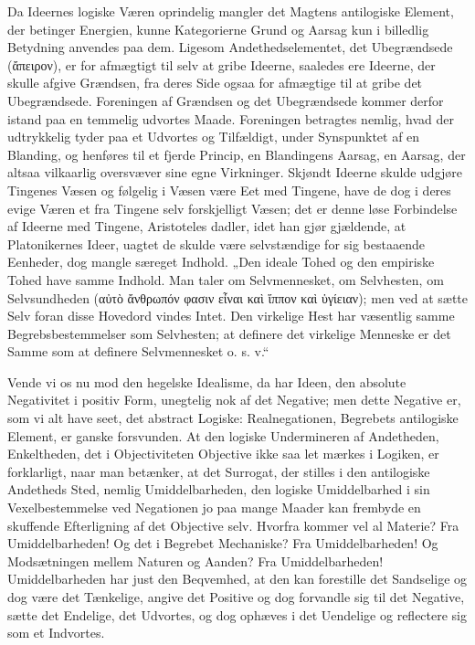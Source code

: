\documentclass[11pt]{book}
\newcommand{\opage}[1]{\marginnote{\footnotesize\textit{[#1]}}}
\begin{document}
Da Ideernes logiske Væren oprindelig mangler det Magtens
antilogiske Element, der betinger Energien, kunne Kategorierne
Grund og Aarsag kun i billedlig Betydning anvendes paa dem.
Ligesom Andethedselementet, det Ubegrændsede (ἄπειρον), er for
afmægtigt til selv at gribe Ideerne, saaledes ere Ideerne, der
skulle afgive Grændsen, fra deres Side ogsaa for afmægtige til at
gribe det Ubegrændsede. Foreningen af Grændsen og det Ubegrændsede
kommer derfor istand paa en temmelig udvortes Maade. Foreningen
betragtes nemlig, hvad der udtrykkelig tyder paa et Udvortes og
Tilfældigt, under Synspunktet af en Blanding, og henføres til et
fjerde Princip, en Blandingens Aarsag, en Aarsag, der altsaa
vilkaarlig oversvæver sine egne Virkninger. Skjøndt Ideerne skulde
udgjøre Tingenes Væsen og følgelig i Væsen være Eet med Tingene,
have de dog i deres evige Væren et fra Tingene selv forskjelligt
Væsen; det er denne løse Forbindelse af Ideerne med Tingene,
Aristoteles dadler, idet han gjør gjældende, at Platonikernes
Ideer, uagtet de skulde være selvstændige for sig bestaaende
Eenheder, dog mangle særeget Indhold. „Den ideale Tohed og den
empiriske Tohed have samme Indhold. Man taler om Selvmennesket, om
Selvhesten, om Selvsundheden (αὐτὸ ἄνθρωπόν φασιν εἶναι καὶ
ἵππον καὶ ὑγίειαν); men ved at sætte Selv foran disse Hovedord
vindes Intet. Den virkelige Hest har væsentlig samme
Begrebsbestemmelser som Selvhesten; at definere det virkelige
Menneske er det Samme som at definere Selvmennesket o. s. v.“

Vende vi os nu mod den hegelske Idealisme, da har Ideen, den
absolute Negativitet i positiv Form, unegtelig nok af det Negative;
men dette Negative er, som vi alt have seet,
\opage{186} \setcounter{footnote}{0}%
det abstract Logiske: Realnegationen, Begrebets antilogiske
Element, er ganske forsvunden. At den logiske Undermineren af
Andetheden, Enkeltheden, det i Objectiviteten Objective ikke saa
let mærkes i Logiken, er forklarligt, naar man betænker, at det
Surrogat, der stilles i den antilogiske Andetheds Sted, nemlig
Umiddelbarheden, den logiske Umiddelbarhed i sin
Vexelbestemmelse ved Negationen jo paa mange Maader kan frembyde en
skuffende Efterligning af det Objective selv. Hvorfra kommer vel al
Materie? Fra Umiddelbarheden! Og det i Begrebet Mechaniske? Fra
Umiddelbarheden! Og Modsætningen mellem Naturen og Aanden? Fra
Umiddelbarheden! Umiddelbarheden har just den Beqvemhed, at den kan
forestille det Sandselige og dog være det Tænkelige, angive det
Positive og dog forvandle sig til det Negative, sætte det Endelige,
det Udvortes, og dog ophæves i det Uendelige og reflectere sig som
et Indvortes.
\end{document}
